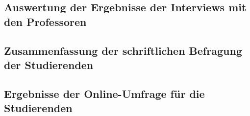 \documentclass[bibliography=totoc,listof=totoc,BCOR=5mm,DIV=12,oneside]{scrbook}
\begin{document}
\newpage
\subsection{Auswertung der Ergebnisse der Interviews mit den Professoren}
\label{anhang:interviewProfessorenAuswertung}


\newpage
\subsection{Zusammenfassung der schriftlichen Befragung der Studierenden}
\label{anhang:schriftlicheBefragungStudierendeZusammenfassung}


\newpage
\subsection{Ergebnisse der Online-Umfrage für die Studierenden}
\label{anhang:onlineUmfrageStudierendeErgebnisse}

\end{document}
